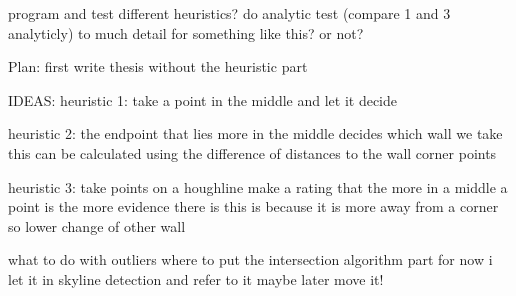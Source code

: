 program and test different heuristics?
do analytic test (compare 1 and 3 analyticly)
	to much detail for something like this? or not?

Plan:
first write thesis without the heuristic part

IDEAS:
heuristic 1:
take a point in the middle and let it decide

heuristic 2:
the endpoint that lies more in the middle decides which wall we take
this can be calculated using the difference of distances to the wall corner points

heuristic 3:
take points on a houghline
make a rating that the more in a middle a point is the more evidence there is
this is because it is more away from a corner so lower change of other wall


what to do with outliers
where to put the intersection algorithm part
for now i let it in skyline detection and refer to it
maybe later move it!



